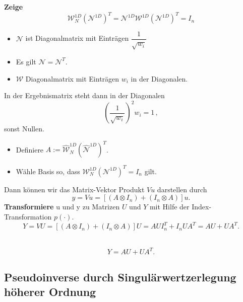 \begin{frame}
\begin{framed}
\textbf{Zeige} 
\begin{equation*}
\mathcal{W}_N^{1D} (\mathcal{N}^{1D})^T = \mathcal{N}^{1D} \mathcal{W}^{1D} (\mathcal{N}^{1D})^T = I_n
\end{equation*}
\end{framed}
\begin{itemize}
\item $\mathcal{N}$ ist Diagonalmatrix mit Einträgen $\dfrac{1}{ \sqrt{w_i} }$
\item Es gilt $\mathcal{N}=\mathcal{N}^T$. 
\item $\mathcal{W}$ Diagonalmatrix mit Einträgen $w_i$ in der Diagonalen.
\end{itemize}
In der Ergebnismatrix steht dann in der Diagonalen 
\begin{equation*}
(\dfrac{1}{ \sqrt{w_i} })^2  w_i = 1 \, ,
\end{equation*}
sonst Nullen.
\end{frame}

\begin{frame}
\begin{itemize}
\item Definiere $A:=\widehat{\mathcal{W}}_N^{1D} (\widehat{\mathcal{N}}^{1D})^T$.
\item Wähle Basis so, dass $\mathcal{W}_N^{1D} (\mathcal{N}^{1D})^T  = I_n$ gilt.
\end{itemize}
Dann können wir das Matrix-Vektor Produkt $Vu$ darstellen durch
\begin{equation*} \label{eq:easy}
y=Vu =[(A \otimes I_n) + (I_n \otimes A)]u.
\end{equation*}
\pause
\textbf{Transformiere} u und y zu Matrizen $U$ und $Y$ mit Hilfe der Index-Transformation $p(\cdot)$.
\begin{equation*} \label{eq:easy}
Y=VU =[(A \otimes I_n) + (I_n \otimes A)]U=AUI_n^T + I_nUA^T=AU+UA^T.
\end{equation*}
\pause
\begin{framed}
 \\
\begin{equation*}
Y=AU+UA^T.
\end{equation*}
\end{framed}
\end{frame}

\subsection{Pseudoinverse durch Singulärwertzerlegung höherer Ordnung}

